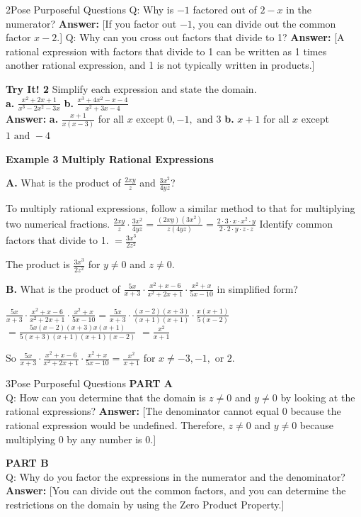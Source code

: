 \documentclass{article}
\newenvironment{example}[1]{\textbf{Example #1}}{}
\newenvironment{tryit}[1]{\textbf{Try It! #1}}{}
\newenvironment{te-addendum}[2]{\textbf{TE (#1 - #2)}}{}
\newcommand{\answer}[1]{\textbf{Answer:} #1}
\begin{document}
\begin{te-addendum}{2}{Pose Purposeful Questions}
Q: Why is $-1$ factored out of $2 - x$ in the numerator?
\answer{[If you factor out $-1$, you can divide out the common factor $x - 2$.]}
Q: Why can you cross out factors that divide to 1?
\answer{[A rational expression with factors that divide to 1 can be written as 1 times another rational expression, and 1 is not typically written in products.]}
\end{te-addendum}

\begin{tryit}{2}
Simplify each expression and state the domain. \\
\textbf{a.} $\frac{x^2 + 2x + 1}{x^3 - 2x^2 - 3x}$ \qquad \textbf{b.} $\frac{x^3 + 4x^2 - x - 4}{x^2 + 3x - 4}$ \\
\answer{\textbf{a.} $\frac{x+1}{x(x-3)}$ for all $x$ except $0, -1, \text{ and } 3$ \qquad \textbf{b.} $x + 1$ for all $x$ except $1 \text{ and } -4$}
\end{tryit}

\begin{example}{3}
\textbf{Multiply Rational Expressions}

\textbf{A.} What is the product of $\frac{2xy}{z}$ and $\frac{3x^2}{4yz}$?

To multiply rational expressions, follow a similar method to that for multiplying two numerical fractions.
$\frac{2xy}{z} \cdot \frac{3x^2}{4yz} = \frac{(2xy)(3x^2)}{z(4yz)} = \frac{2 \cdot 3 \cdot x \cdot x^2 \cdot y}{2 \cdot 2 \cdot y \cdot z \cdot z}$
Identify common factors that divide to 1.
$= \frac{3x^3}{2z^2}$

The product is $\frac{3x^3}{2z^2}$ for $y \neq 0$ and $z \neq 0$.

\textbf{B.} What is the product of $\frac{5x}{x+3} \cdot \frac{x^2 + x - 6}{x^2 + 2x + 1} \cdot \frac{x^2 + x}{5x - 10}$ in simplified form?

$\frac{5x}{x+3} \cdot \frac{x^2 + x - 6}{x^2 + 2x + 1} \cdot \frac{x^2 + x}{5x - 10} = \frac{5x}{x+3} \cdot \frac{(x-2)(x+3)}{(x+1)(x+1)} \cdot \frac{x(x+1)}{5(x-2)}$
$= \frac{5x(x-2)(x+3)x(x+1)}{5(x+3)(x+1)(x+1)(x-2)}$
$= \frac{x^2}{x+1}$

So $\frac{5x}{x+3} \cdot \frac{x^2 + x - 6}{x^2 + 2x + 1} \cdot \frac{x^2 + x}{5x - 10} = \frac{x^2}{x+1}$ for $x \neq -3, -1, \text{ or } 2$.
\end{example}

\begin{te-addendum}{3}{Pose Purposeful Questions}
\textbf{PART A} \\
Q: How can you determine that the domain is $z \neq 0$ and $y \neq 0$ by looking at the rational expressions?
\answer{[The denominator cannot equal 0 because the rational expression would be undefined. Therefore, $z \neq 0$ and $y \neq 0$ because multiplying 0 by any number is 0.]}

\textbf{PART B} \\
Q: Why do you factor the expressions in the numerator and the denominator?
\answer{[You can divide out the common factors, and you can determine the restrictions on the domain by using the Zero Product Property.]}
\end{te-addendum}
\end{document}
